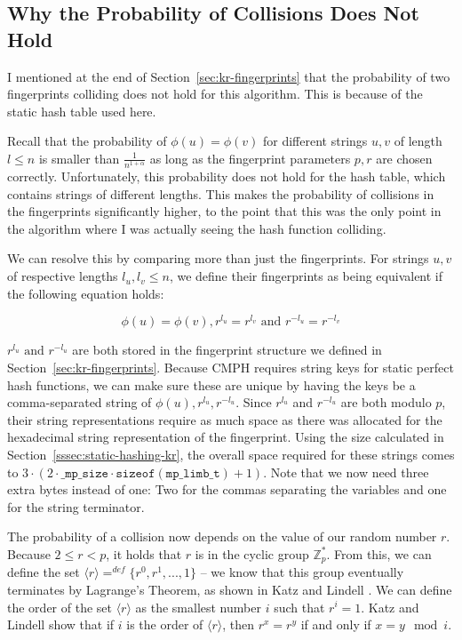\documentclass[ %
                    author={Dominic Joseph Moylett},
                    degree={MEng},
                     title={Dictionary Matching with Fingerprints},
                  subtitle={An Empirical Analysis},
                      type={research},
                      year={2015} ]{dissertation}
\begin{document}
\subsection{Why the Probability of Collisions Does Not Hold}
\label{ssec:short-collisions}

I mentioned at the end of Section~\ref{sec:kr-fingerprints} that the probability of two fingerprints colliding does not hold for this algorithm. This is because of the static hash table used here.

Recall that the probability of $\phi(u) = \phi(v)$ for different strings $u, v$ of length $l \leq n$ is smaller than $\frac{1}{n^{1 + \alpha}}$ as long as the fingerprint parameters $p, r$ are chosen correctly. Unfortunately, this probability does not hold for the hash table, which contains strings of different lengths. This makes the probability of collisions in the fingerprints significantly higher, to the point that this was the only point in the algorithm where I was actually seeing the hash function colliding.

We can resolve this by comparing more than just the fingerprints. For strings $u, v$ of respective lengths $l_u, l_v \leq n$, we define their fingerprints as being equivalent if the following equation holds:

$$\phi(u) = \phi(v), r^{l_u} = r^{l_v} \text{ and } r^{-l_u} = r^{-l_v}$$

$r^{l_u} \text{ and } r^{-l_u}$ are both stored in the fingerprint structure we defined in Section~\ref{sec:kr-fingerprints}. Because CMPH requires string keys for static perfect hash functions, we can make sure these are unique by having the keys be a comma-separated string of $\phi(u),r^{l_u},r^{-l_u}$. Since $r^{l_u}$ and $r^{-l_u}$ are both modulo $p$, their string representations require as much space as there was allocated for the hexadecimal string representation of the fingerprint. Using the size calculated in Section~\ref{sssec:static-hashing-kr}, the overall space required for these strings comes to $3 \cdot (2 \cdot \texttt{\_mp\_size} \cdot \texttt{sizeof}(\texttt{mp\_limb\_t}) + 1)$. Note that we now need three extra bytes instead of one: Two for the commas separating the variables and one for the string terminator.

The probability of a collision now depends on the value of our random number $r$. Because $2 \leq r < p$, it holds that $r$ is in the cyclic group $\mathbb{Z}^*_p$. From this, we can define the set $\langle r \rangle =^{def} \{r^0, r^1,...,1\}$ -- we know that this group eventually terminates by Lagrange's Theorem, as shown in Katz and Lindell \cite{katz:lagrange}. We can define the order of the set $\langle r \rangle$ as the smallest number $i$ such that $r^i = 1$. Katz and Lindell \cite{katz:cyclic-groups} show that if $i$ is the order of $\langle r \rangle$, then $r^x = r^y$ if and only if $x = y \mod i$.
\end{document}
